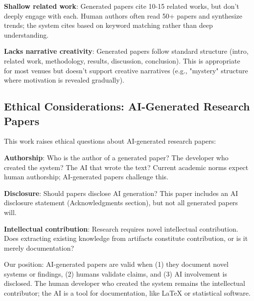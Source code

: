 \textbf{Shallow related work}: Generated papers cite 10-15 related works, but don't deeply engage with each. Human authors often read 50+ papers and synthesize trends; the system cites based on keyword matching rather than deep understanding.

\textbf{Lacks narrative creativity}: Generated papers follow standard structure (intro, related work, methodology, results, discussion, conclusion). This is appropriate for most venues but doesn't support creative narratives (e.g., "mystery" structure where motivation is revealed gradually).

\subsection{Ethical Considerations: AI-Generated Research Papers}

This work raises ethical questions about AI-generated research papers:

\textbf{Authorship}: Who is the author of a generated paper? The developer who created the system? The AI that wrote the text? Current academic norms expect human authorship; AI-generated papers challenge this.

\textbf{Disclosure}: Should papers disclose AI generation? This paper includes an AI disclosure statement (Acknowledgments section), but not all generated papers will.

\textbf{Intellectual contribution}: Research requires novel intellectual contribution. Does extracting existing knowledge from artifacts constitute contribution, or is it merely documentation?

Our position: AI-generated papers are valid when (1) they document novel systems or findings, (2) humans validate claims, and (3) AI involvement is disclosed. The human developer who created the system remains the intellectual contributor; the AI is a tool for documentation, like LaTeX or statistical software.